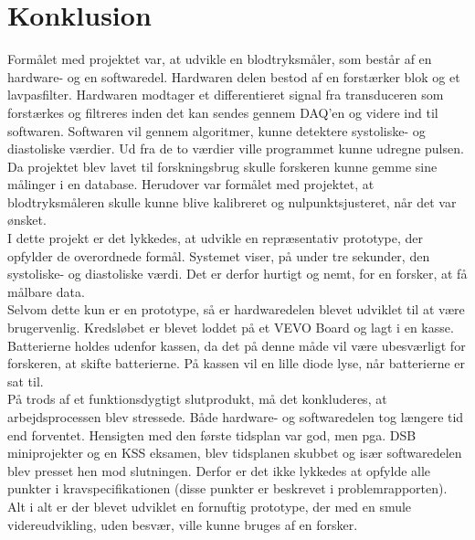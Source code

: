 \chapter{Konklusion}
Formålet med projektet var, at udvikle en blodtryksmåler, som består af en hardware- og en softwaredel. Hardwaren delen bestod af en forstærker blok og et lavpasfilter. Hardwaren modtager et differentieret signal fra transduceren som forstærkes og filtreres inden det kan sendes gennem DAQ'en og videre ind til softwaren. Softwaren vil gennem algoritmer, kunne detektere systoliske- og diastoliske værdier. Ud fra de to værdier ville programmet kunne udregne pulsen. \\
Da projektet blev lavet til forskningsbrug skulle forskeren kunne gemme sine målinger i en database. Herudover var formålet med projektet, at blodtryksmåleren skulle kunne blive kalibreret og nulpunktsjusteret, når det var ønsket. \\
I dette projekt er det lykkedes, at udvikle en repræsentativ prototype, der opfylder de overordnede formål. Systemet viser, på under tre sekunder, den systoliske- og diastoliske værdi. Det er derfor hurtigt og nemt, for en forsker, at få målbare data.\\
Selvom dette kun er en prototype, så er hardwaredelen blevet udviklet til at være brugervenlig. Kredsløbet er blevet loddet på et VEVO Board og lagt i en kasse. Batterierne holdes udenfor kassen, da det på denne måde vil være ubesværligt for forskeren, at skifte batterierne. På kassen vil en lille diode lyse, når batterierne er sat til. \\
På trods af et funktionsdygtigt slutprodukt, må det konkluderes, at arbejdsprocessen blev stressede. Både hardware- og softwaredelen tog længere tid end forventet. Hensigten med den første tidsplan var god, men pga. DSB miniprojekter og en KSS eksamen, blev tidsplanen skubbet og især softwaredelen blev presset hen mod slutningen. Derfor er det ikke lykkedes at opfylde alle punkter i kravspecifikationen (disse punkter er beskrevet i problemrapporten). \\
Alt i alt er der blevet udviklet en fornuftig prototype, der med en smule videreudvikling, uden besvær, ville kunne bruges af en forsker. \\

